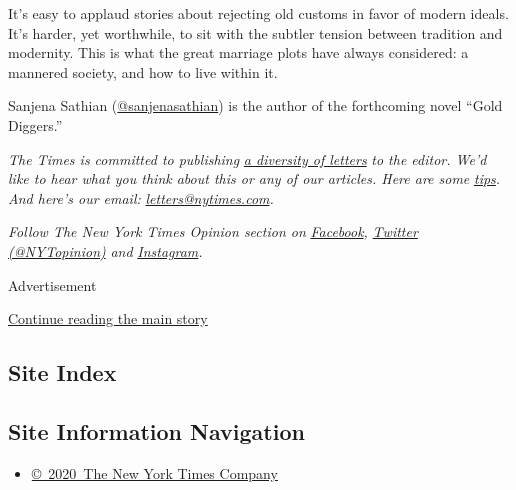 It's easy to applaud stories about rejecting old customs in favor of
modern ideals. It's harder, yet worthwhile, to sit with the subtler
tension between tradition and modernity. This is what the great marriage
plots have always considered: a mannered society, and how to live within
it.

Sanjena Sathian
(\href{https://twitter.com/sanjenasathian}{@sanjenasathian}) is the
author of the forthcoming novel ``Gold Diggers.''

\emph{The Times is committed to publishing}
\href{https://www.nytimes.com/2019/01/31/opinion/letters/letters-to-editor-new-york-times-women.html}{\emph{a
diversity of letters}} \emph{to the editor. We'd like to hear what you
think about this or any of our articles. Here are some}
\href{https://help.nytimes.com/hc/en-us/articles/115014925288-How-to-submit-a-letter-to-the-editor}{\emph{tips}}\emph{.
And here's our email:}
\href{mailto:letters@nytimes.com}{\emph{letters@nytimes.com}}\emph{.}

\emph{Follow The New York Times Opinion section on}
\href{https://www.facebook.com/nytopinion}{\emph{Facebook}}\emph{,}
\href{http://twitter.com/NYTOpinion}{\emph{Twitter (@NYTopinion)}}
\emph{and}
\href{https://www.instagram.com/nytopinion/}{\emph{Instagram}}\emph{.}

Advertisement

\protect\hyperlink{after-bottom}{Continue reading the main story}

\hypertarget{site-index}{%
\subsection{Site Index}\label{site-index}}

\hypertarget{site-information-navigation}{%
\subsection{Site Information
Navigation}\label{site-information-navigation}}

\begin{itemize}
\tightlist
\item
  \href{https://help.nytimes.com/hc/en-us/articles/115014792127-Copyright-notice}{©~2020~The
  New York Times Company}
\end{itemize}

